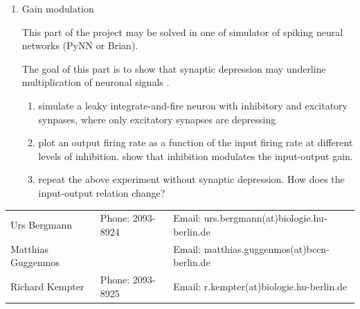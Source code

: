 \documentclass[12pt]{article}
\begin{document}
\begin{enumerate}
    \item Gain modulation

        This part of the project may be solved in one of simulator of
        spiking neural networks (PyNN or Brian).

The goal of this part is to show that synaptic depression may
underline multiplication of neuronal signals \cite{}.

\begin{enumerate}
\item simulate a leaky integrate-and-fire neuron with inhibitory and
    excitatory synpases, where only excitatory synapses are depressing

\item plot an output firing rate as a function of the input firing
    rate at different levels of inhibition. show that inhibition
    modulates the input-output gain.

\item repeat the above experiment without synaptic depression. How
    does the input-output relation change?
\end{enumerate}


\end{enumerate}



\vfill
\begin{tabular}{lll}
Urs Bergmann & Phone: 2093-8924 & Email:
urs.bergmann(at)biologie.hu-berlin.de \\
Matthias Guggenmos & & Email: matthias.guggenmos(at)bccn-berlin.de \\
Richard Kempter \hfill & Phone: 2093-8925 \hfill & Email:
r.kempter(at)biologie.hu-berlin.de \\
\end{tabular}
\end{document}
